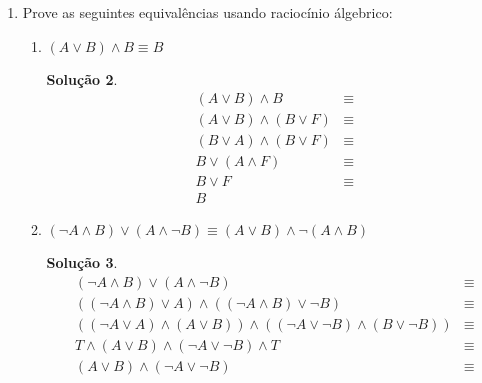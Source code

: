 \documentclass[11pt,a4paper]{report}
\newtheorem*{Solucao}{Solu\c{c}\~ao}
\begin{document}
\begin{enumerate}
\begin{enumerate}
\begin{Solucao}
\[{{{                                                        \infer[\scriptstyle{\land_{ED}}]
                                                                 {r}
                                                                 {p \land r^1}
                                                    }
                                        }
                             }
                    \]
                  \end{Solucao}
	\end{enumerate}
	\item Prove as seguintes equival\^encias usando racioc\'inio \'algebrico:
	\begin{enumerate}
		\item $(A\lor B)\land B\equiv B$
                \begin{Solucao}
                  \[
                  \begin{array}{lc}
                    (A \lor B) \land B & \equiv \\
                    (A \lor B) \land (B \lor F) & \equiv \\
                    (B \lor A) \land (B \lor F) & \equiv \\
                    B \lor (A \land F) & \equiv \\
                    B \lor F & \equiv \\
                    B
                  \end{array}
                  \]
                \end{Solucao}
		\item $(\neg A\land B)\lor (A\land\neg B)\equiv (A\lor
                  B)\land \neg (A\land B)$
                  \begin{Solucao}
                    \[
                    \begin{array}{lc}
                      (\neg A\land B)\lor (A\land\neg B) & \equiv \\
                      ((\neg A \land B) \lor A) \land ((\neg A \land B)
                      \lor \neg B) & \equiv \\
                      ((\neg A \lor A)\land (A \lor B)) \land ((\neg A
                      \lor \neg B) \land (B \lor \neg B)) & \equiv \\
                      T \land (A \lor B) \land (\neg A \lor \neg B)
                      \land T & \equiv \\
                      (A \lor B) \land (\neg A \lor \neg B) & \equiv
                      \\

\end{array}\]
\end{Solucao}
\end{enumerate}
\end{enumerate}
\end{document}

